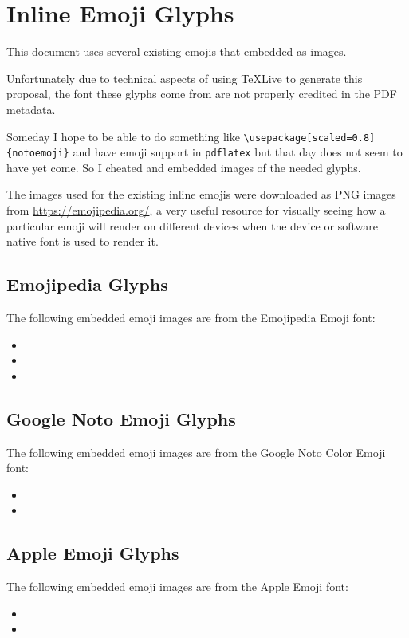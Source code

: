\section{Inline Emoji Glyphs}

This document uses several existing emojis that embedded as images.

Unfortunately due to technical aspects of using \TeX{}Live to generate this proposal, the font
these glyphs come from are not properly credited in the PDF metadata.

Someday I hope to be able to do something like
\texttt{\textbackslash{}usepackage[scaled=0.8]\{notoemoji\}}
and have emoji support in \texttt{pdflatex} but that day does not seem
to have yet come. So I cheated and embedded images of the needed glyphs.

The images used for the existing inline emojis were downloaded as
PNG images from \url{https://emojipedia.org/}, a very useful resource
for visually seeing how a particular emoji will render on different
devices when the device or software native font is used to render it.

\subsection*{Emojipedia Glyphs}

The following embedded emoji images are from the Emojipedia Emoji font:

\begin{itemize}
\item \brainemoji{}
\item \infinityemoji{}
\item \jigsawemoji{}
\end{itemize}

\subsection*{Google Noto Emoji Glyphs}

The following embedded emoji images are from the Google\textsuperscript{\textregistered} Noto Color Emoji font:

\begin{itemize}
\item \rainbow{}
\item \prideflag{}
\end{itemize}

\subsection*{Apple Emoji Glyphs}

The following embedded emoji images are from the Apple\textsuperscript{\textregistered} Emoji font:

\begin{itemize}
\item \nerdface{}
\item \goldheart{}
\end{itemize}
